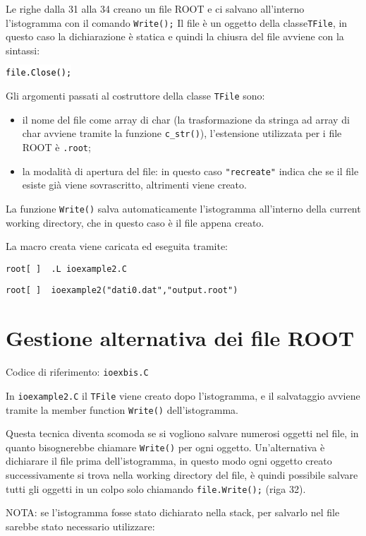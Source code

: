 \documentclass{article}
\newcommand{\ttt}{\texttt}
\newcommand{\tcpp}[1]{\hspace{10pt}\colorbox{background}{\textcolor{black}{\texttt{#1}}}}
\newcommand{\troot}[1]{\hspace{10pt}\colorbox{bashbackground}{\textcolor{bashtext}{\texttt{root[~]~~#1}}}}
\begin{document}
Le righe dalla 31 alla 34 creano un file ROOT e ci salvano all'interno l'istogramma con il comando \ttt{Write();}
Il file è un oggetto della classe\ttt{TFile}, in questo caso la dichiarazione è statica e quindi la chiusra del file avviene con la sintassi:

\tcpp{file.Close();}

Gli argomenti passati al costruttore della classe \ttt{TFile} sono:
\begin{itemize}
    \item il nome del file come array di char (la trasformazione da stringa ad array di char avviene tramite la funzione \ttt{c\_str()}), l'estensione utilizzata per i file ROOT è \ttt{.root};
    \item la modalità di apertura del file: in questo caso \ttt{"recreate"} indica che se il file esiste già viene sovrascritto, altrimenti viene creato.
\end{itemize}

La funzione \ttt{Write()} salva automaticamente l'istogramma all'interno della current working directory, che in questo caso è il file appena creato.


La macro creata viene caricata ed eseguita tramite:

\vspace{5pt}

\troot{.L ioexample2.C}

\troot{ioexample2("dati0.dat","output.root")}
\vspace{5pt}


\section{Gestione alternativa dei file ROOT}
Codice di riferimento: \ttt{ioexbis.C} \vspace{10pt}

In \ttt{ioexample2.C} il \ttt{TFile} viene creato dopo l'istogramma, e il salvataggio avviene tramite la member function \ttt{Write()} dell'istogramma.

Questa tecnica diventa scomoda se si vogliono salvare numerosi oggetti nel file, in quanto bisognerebbe chiamare \ttt{Write()} per ogni oggetto.
Un'alternativa è dichiarare il file prima dell'istogramma, in questo modo ogni oggetto creato successivamente si trova nella working directory del file,
è quindi possibile salvare tutti gli oggetti in un colpo solo chiamando \ttt{file.Write();} (riga 32).

NOTA: se l'istogramma fosse stato dichiarato nella stack, per salvarlo nel file sarebbe stato necessario utilizzare:
\end{document}

